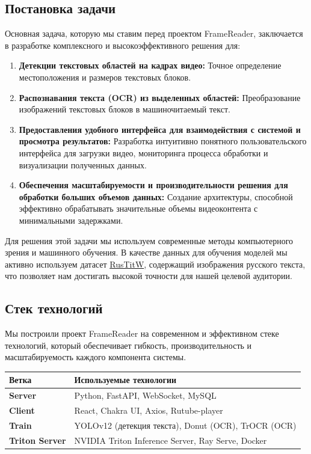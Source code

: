 \documentclass[12pt, a4paper]{article}
\theoremstyle{definition}
\theoremstyle{remark}
\begin{document}
	\subsection{Постановка задачи}
	Основная задача, которую мы ставим перед проектом FrameReader, заключается в разработке комплексного и высокоэффективного решения для:
	\begin{enumerate}
		\item \textbf{Детекции текстовых областей на кадрах видео:} Точное определение местоположения и размеров текстовых блоков.
		\item \textbf{Распознавания текста (OCR) из выделенных областей:} Преобразование изображений текстовых блоков в машиночитаемый текст.
		\item \textbf{Предоставления удобного интерфейса для взаимодействия с системой и просмотра результатов:} Разработка интуитивно понятного пользовательского интерфейса для загрузки видео, мониторинга процесса обработки и визуализации полученных данных.
		\item \textbf{Обеспечения масштабируемости и производительности решения для обработки больших объемов данных:} Создание архитектуры, способной эффективно обрабатывать значительные объемы видеоконтента с минимальными задержками.
	\end{enumerate}
	Для решения этой задачи мы используем современные методы компьютерного зрения и машинного обучения. В качестве данных для обучения моделей мы активно используем датасет \href{https://www.kaggle.com/datasets/hardtype/rustitw-russian-language-visual-text-recognition}{RusTitW}, содержащий изображения русского текста, что позволяет нам достигать высокой точности для нашей целевой аудитории.
	
	\subsection{Стек технологий}
	Мы построили проект FrameReader на современном и эффективном стеке технологий, который обеспечивает гибкость, производительность и масштабируемость каждого компонента системы.
	
	\bigskip
	\noindent
	\begin{tabularx}{\textwidth}{|l|>{\RaggedRight\arraybackslash}X|}
		\toprule
		\textbf{Ветка} & \textbf{Используемые технологии} \\
		\midrule
		\textbf{Server} & Python, FastAPI, WebSocket, MySQL \\
		\midrule
		\textbf{Client} & React, Chakra UI, Axios, Rutube-player \\
		\midrule
		\textbf{Train} & YOLOv12 (детекция текста), Donut (OCR), TrOCR (OCR) \\
		\midrule
		\textbf{Triton Server} & NVIDIA Triton Inference Server, Ray Serve, Docker \\
		\bottomrule
	\end{tabularx}
	
\end{document}
